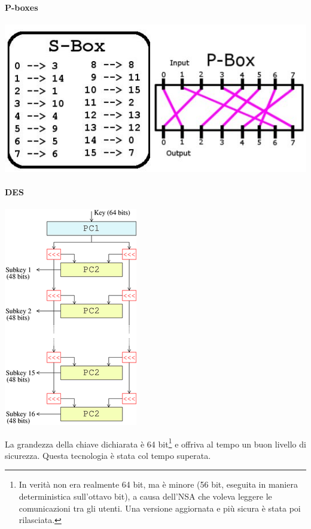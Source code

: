 \paragraph{P-boxes}

\begin{center}
  \includegraphics[scale=0.3]{res/img/pboxes.png}
  \label{fig:password:pboxes}
\end{center}


\paragraph{DES}

\begin{center}
  \includegraphics[scale=0.5]{res/img/des.png}
\label{fig:password:des}
\end{center}

La grandezza della chiave dichiarata è 64 bit\footnote{In verità non era
realmente 64 bit, ma è minore (56 bit, eseguita in maniera deterministica
sull'ottavo bit), a causa dell'NSA che voleva leggere le comunicazioni tra gli
utenti. Una versione aggiornata e più sicura è stata poi rilasciata.} e offriva
al tempo un buon livello di sicurezza. Questa tecnologia è stata col tempo
superata.

